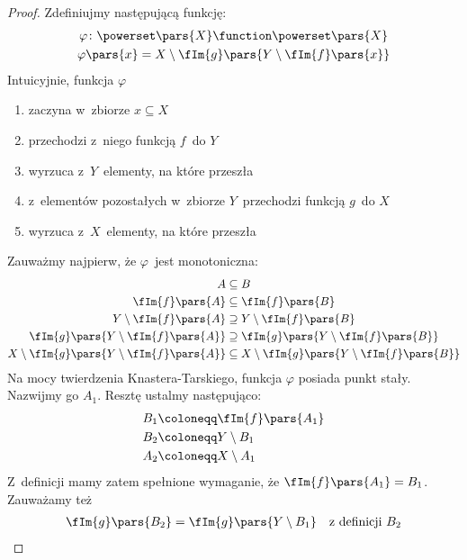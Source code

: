 \begin{proof}
	Zdefiniujmy następującą funkcję:
	\begin{gather*}
		\varphi\colon \powerset\pars{X} \function \powerset\pars{X}\\
		\varphi\pars{x} = X \setminus \fIm{g}\pars{Y \setminus \fIm{f}\pars{x}}
	\end{gather*}
	Intuicyjnie, funkcja \(\varphi\)
	\begin{enumerate}
		\item zaczyna w~zbiorze \(x \subseteq X\)
		\item przechodzi z~niego funkcją \(f\)~do \(Y\)
		\item wyrzuca z~\(Y\)~elementy, na które przeszła
		\item z~elementów pozostałych w~zbiorze \(Y\)~przechodzi funkcją \(g\)~do \(X\)
		\item wyrzuca z~\(X\)~elementy, na które przeszła
	\end{enumerate}
	Zauważmy najpierw, że \(\varphi\)~jest monotoniczna:
	\begin{align*}
		A                                                     & \subseteq B                                                     \\
		\fIm{f}\pars{A}                                       & \subseteq \fIm{f}\pars{B}                                       \\
		Y \setminus \fIm{f}\pars{A}                           & \supseteq Y \setminus \fIm{f}\pars{B}                           \\
		\fIm{g}\pars{Y \setminus \fIm{f}\pars{A}}             & \supseteq \fIm{g}\pars{Y \setminus \fIm{f}\pars{B}}             \\
		X \setminus \fIm{g}\pars{Y \setminus \fIm{f}\pars{A}} & \subseteq X \setminus \fIm{g}\pars{Y \setminus \fIm{f}\pars{B}}
	\end{align*}
	Na mocy twierdzenia Knastera-Tarskiego, funkcja \(\varphi\) posiada punkt stały. Nazwijmy go \(A_1\). Resztę ustalmy następująco:
	\begin{align*}
		B_1 & \coloneqq \fIm{f}\pars{A_1} \\
		B_2 & \coloneqq Y \setminus B_1   \\
		A_2 & \coloneqq X \setminus A_1
	\end{align*}
	Z~definicji mamy zatem spełnione wymaganie, że \(\fIm{f}\pars{A_1} = B_1\). Zauważamy też
	\begin{align*}
		\fIm{g}\pars{B_2}
		 & = \fIm{g}\pars{Y \setminus B_1}                                              &  & \text{z~definicji \(B_2\)}         \\

\end{align*}
\end{proof}
